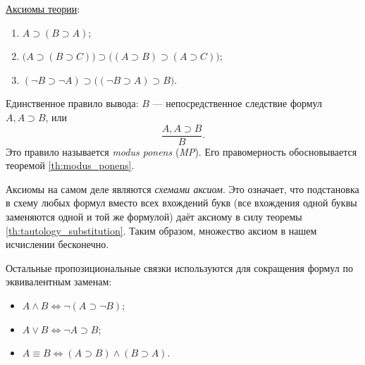 \underline{Аксиомы теории}:
\begin{enumerate}[label=(А\arabic*)]
    \item $A \supset (B \supset A)$;
    \item $\Big(A \supset (B \supset C)\Big) \supset \Big((A \supset B) \supset (A \supset C)\Big)$;
    \item $(\neg B \supset \neg A) \supset \Big((\neg B \supset A) \supset B\Big)$.
\end{enumerate}
Единственное правило вывода: $B$ --- непосредственное следствие формул $A, A \supset B$, или
\[
    \frac{A, A \supset B}{B}.
\]
Это правило называется \textit{modus ponens} (\textit{MP}). Его правомерность обосновывается теоремой \ref{th:modus_ponens}.
\begin{remark}
    Аксиомы на самом деле являются \textit{схемами аксиом}. Это означает, что подстановка в схему любых формул вместо всех вхождений букв (все вхождения одной буквы заменяются одной и той же формулой) даёт аксиому в силу теоремы \ref{th:tautology_substitution}. Таким образом, множество аксиом в нашем исчислении бесконечно.
\end{remark}
\begin{remark}
    Остальные пропозициональные связки используются для сокращения формул по эквивалентным заменам:
    \begin{itemize}
        \item $A \land B \Longleftrightarrow \neg(A \supset \neg B)$;
        \item $A \lor B \Longleftrightarrow \neg A \supset B$;
        \item $A \equiv B \Longleftrightarrow (A \supset B) \land (B \supset A)$.
    \end{itemize}
\end{remark}

